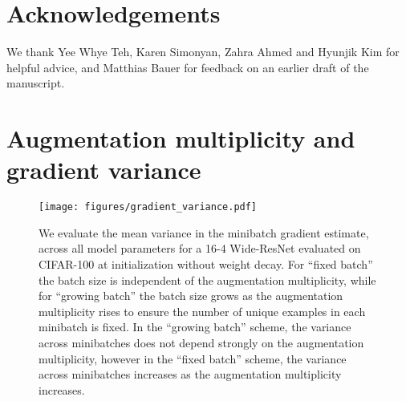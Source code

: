 \documentclass{article}
\begin{document}
 \section*{Acknowledgements}
We thank Yee Whye Teh, Karen Simonyan, Zahra Ahmed and Hyunjik Kim for helpful advice, and Matthias Bauer for feedback on an earlier draft of the manuscript.

\newpage






\appendix
	


	



























\section{Augmentation multiplicity and gradient variance}
\label{app:variance}

\begin{figure}[h]
\centering
\texttt{[image: figures/gradient\_variance.pdf]}
\caption{We evaluate the mean variance in the minibatch gradient estimate, across all model parameters for a 16-4 Wide-ResNet evaluated on CIFAR-100 at initialization without weight decay. For ``fixed batch'' the batch size  is independent of the augmentation multiplicity, while for ``growing batch'' the batch size  grows as the augmentation multiplicity rises to ensure the number of unique examples in each minibatch is fixed. In the ``growing batch'' scheme, the variance across minibatches does not depend strongly on the augmentation multiplicity, however in the ``fixed batch'' scheme, the variance across minibatches increases as the augmentation multiplicity increases.
}
\label{fig:variance}
\end{figure}
\end{document}
